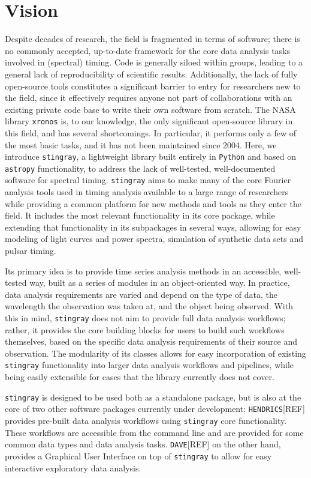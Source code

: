 \documentclass[12pt]{emulateapj}
\newcommand{\stingray}{\texttt{stingray}\xspace}
\newcommand{\python}{\texttt{Python}\xspace}
\newcommand{\astropy}{\texttt{astropy}\xspace}
\newcommand{\hendrics}{\texttt{HENDRICS}\xspace}
\newcommand{\dave}{\texttt{DAVE}\xspace}
\begin{document}
\section{Vision}

Despite decades of research, the field is fragmented in terms of software; there is no commonly accepted, up-to-date framework for the core data analysis tasks involved in (spectral) timing. Code is generally siloed within groups, leading to a general lack of reproducibility of scientific results. Additionally, the lack of fully open-source tools constitutes a significant barrier to entry for researchers new to the field, since it effectively requires anyone not part of collaborations with an existing private code base to write their own software from scratch. 
The NASA library \texttt{xronos} is, to our knowledge, the only significant open-source library in this field, and has several shortcomings. 
In particular, it performs only a few of the most basic tasks, and it has not been maintained since 2004. 
Here, we introduce \stingray, a lightweight library built entirely in \python and based on \astropy functionality, to address the lack of well-tested, well-documented software for spectral timing. 
\stingray aims to make many of the core Fourier analysis tools used in timing analysis available to a large range of researchers while providing a common platform for new methods and tools as they enter the field. 
It includes the most relevant functionality in its core package, while extending that functionality in its subpackages in several ways, allowing for easy modeling of light curves and power spectra, simulation of synthetic data sets and pulsar timing. 

Its primary idea is to provide time series analysis methods in an accessible, well-tested way, built as a series of modules in an object-oriented way. In practice, data 
analysis requirements are varied and depend on the type of data, the wavelength the observation was taken at, and the object being observed. With this in mind, 
\stingray does not aim to provide full data analysis workflows; rather, it provides the core building blocks for users to build such workflows themselves, based on the specific data analysis requirements of their source and observation. 
The modularity of its classes allows for easy incorporation of existing \stingray functionality into larger data analysis workflows and pipelines, while being easily extensible for cases that the library currently does not cover. 

\stingray is designed to be used both as a standalone package, but is also at the core of two other software packages currently under development: \hendrics [REF] provides pre-built data analysis workflows using \stingray core functionality. These workflows are accessible from the command line and are provided for some common data types and data analysis tasks. \dave [REF] on the other hand, provides a Graphical User Interface on top of \stingray to allow for easy interactive exploratory data analysis.
 
\end{document}
